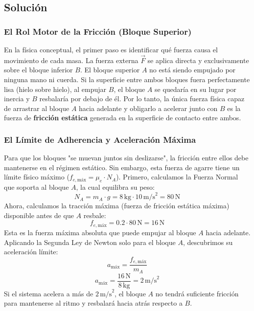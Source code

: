 \documentclass[12pt]{article}
\begin{document}
\subsection*{Solución}

\subsubsection*{El Rol Motor de la Fricción (Bloque Superior)}
En la física conceptual, el primer paso es identificar qué fuerza causa el movimiento de cada masa. La fuerza externa $\vec{F}$ se aplica directa y exclusivamente sobre el bloque inferior $B$. El bloque superior $A$ no está siendo empujado por ninguna mano ni cuerda. Si la superficie entre ambos bloques fuera perfectamente lisa (hielo sobre hielo), al empujar $B$, el bloque $A$ se quedaría en su lugar por inercia y $B$ resbalaría por debajo de él. 
Por lo tanto, la única fuerza física capaz de arrastrar al bloque $A$ hacia adelante y obligarlo a acelerar junto con $B$ es la fuerza de \textbf{fricción estática} generada en la superficie de contacto entre ambos. 

\subsubsection*{El Límite de Adherencia y Aceleración Máxima}
Para que los bloques "se muevan juntos sin deslizarse", la fricción entre ellos debe mantenerse en el régimen estático. Sin embargo, esta fuerza de agarre tiene un límite físico máximo ($f_{e,\text{máx}} = \mu_e \cdot N_A$).
Primero, calculamos la Fuerza Normal que soporta al bloque $A$, la cual equilibra su peso:
\begin{equation}
    N_A = m_A \cdot g = 8 \, \text{kg} \cdot 10 \, \text{m/s}^2 = 80 \, \text{N}
\end{equation}
Ahora, calculamos la tracción máxima (fuerza de fricción estática máxima) disponible antes de que $A$ resbale:
\begin{equation}
    f_{e,\text{máx}} = 0.2 \cdot 80 \, \text{N} = 16 \, \text{N}
\end{equation}
Esta es la fuerza máxima absoluta que puede empujar al bloque $A$ hacia adelante. Aplicando la Segunda Ley de Newton solo para el bloque $A$, descubrimos su aceleración límite:
\begin{equation}
    a_{\text{máx}} = \frac{f_{e,\text{máx}}}{m_A}
\end{equation}
\begin{equation}
    a_{\text{máx}} = \frac{16 \, \text{N}}{8 \, \text{kg}} = 2 \, \text{m/s}^2
\end{equation}
Si el sistema acelera a más de $2 \, \text{m/s}^2$, el bloque $A$ no tendrá suficiente fricción para mantenerse al ritmo y resbalará hacia atrás respecto a $B$.
\end{document}
